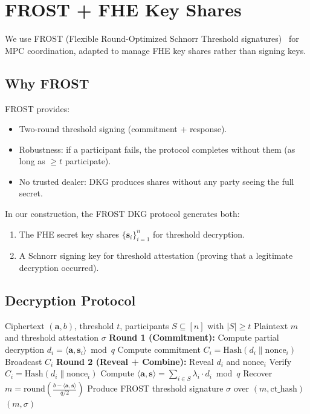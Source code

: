 \documentclass[11pt,a4paper]{article}
\begin{document}
\section{FROST + FHE Key Shares}

We use FROST (Flexible Round-Optimized Schnorr Threshold signatures)~\cite{frost2020} for MPC coordination, adapted to manage FHE key shares rather than signing keys.

\subsection{Why FROST}

FROST provides:
\begin{itemize}[leftmargin=2em]
\item Two-round threshold signing (commitment + response).
\item Robustness: if a participant fails, the protocol completes without them (as long as $\geq t$ participate).
\item No trusted dealer: DKG produces shares without any party seeing the full secret.
\end{itemize}

In our construction, the FROST DKG protocol generates both:
\begin{enumerate}[leftmargin=2em]
\item The FHE secret key shares $\{\mathbf{s}_i\}_{i=1}^n$ for threshold decryption.
\item A Schnorr signing key for threshold attestation (proving that a legitimate decryption occurred).
\end{enumerate}

\subsection{Decryption Protocol}

\begin{algorithm}[H]
\caption{Threshold FHE Decryption with FROST Attestation}
\begin{algorithmic}[1]
\Require Ciphertext $(\mathbf{a}, b)$, threshold $t$, participants $S \subseteq [n]$ with $|S| \geq t$
\Ensure Plaintext $m$ and threshold attestation $\sigma$
\State \textbf{Round 1 (Commitment):}
    \State Compute partial decryption $d_i = \langle \mathbf{a}, \mathbf{s}_i \rangle \bmod q$
    \State Compute commitment $C_i = \text{Hash}(d_i \| \text{nonce}_i)$
    \State Broadcast $C_i$
\EndFor
\State \textbf{Round 2 (Reveal + Combine):}
    \State Reveal $d_i$ and $\text{nonce}_i$
    \State Verify $C_i = \text{Hash}(d_i \| \text{nonce}_i)$
\EndFor
\State Compute $\langle \mathbf{a}, \mathbf{s} \rangle = \sum_{i \in S} \lambda_i \cdot d_i \bmod q$
\State Recover $m = \text{round}\left(\frac{b - \langle \mathbf{a}, \mathbf{s} \rangle}{q/2}\right)$
\State Produce FROST threshold signature $\sigma$ over $(m, \text{ct\_hash})$
\State \Return $(m, \sigma)$
\end{algorithmic}
\end{algorithm}
\end{document}
